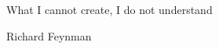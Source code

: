 \thispagestyle{empty}
\mbox{}\vfill
\epigraph{What I cannot create, I do not understand}{Richard Feynman}
